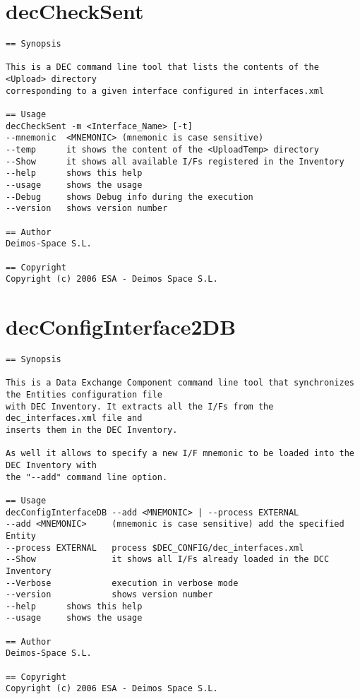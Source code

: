 \documentclass[dec_sum_main.tex]{subfiles}
\begin{document}
\section{decCheckSent} \label{decCheckSent}

\begin{verbatim}
== Synopsis

This is a DEC command line tool that lists the contents of the <Upload> directory
corresponding to a given interface configured in interfaces.xml

== Usage
decCheckSent -m <Interface_Name> [-t]
--mnemonic  <MNEMONIC> (mnemonic is case sensitive)
--temp      it shows the content of the <UploadTemp> directory
--Show      it shows all available I/Fs registered in the Inventory
--help      shows this help
--usage     shows the usage
--Debug     shows Debug info during the execution
--version   shows version number

== Author
Deimos-Space S.L.

== Copyright
Copyright (c) 2006 ESA - Deimos Space S.L.
\end{verbatim}

\label{decConfigInterface2DB}
\section{decConfigInterface2DB}

\begin{verbatim}
== Synopsis

This is a Data Exchange Component command line tool that synchronizes the Entities configuration file
with DEC Inventory. It extracts all the I/Fs from the dec_interfaces.xml file and 
inserts them in the DEC Inventory.

As well it allows to specify a new I/F mnemonic to be loaded into the DEC Inventory with 
the "--add" command line option.

== Usage
decConfigInterfaceDB --add <MNEMONIC> | --process EXTERNAL
--add <MNEMONIC>     (mnemonic is case sensitive) add the specified Entity  
--process EXTERNAL   process $DEC_CONFIG/dec_interfaces.xml
--Show               it shows all I/Fs already loaded in the DCC Inventory
--Verbose            execution in verbose mode
--version            shows version number
--help      shows this help
--usage     shows the usage

== Author
Deimos-Space S.L.

== Copyright
Copyright (c) 2006 ESA - Deimos Space S.L.

\end{verbatim}
\end{document}
